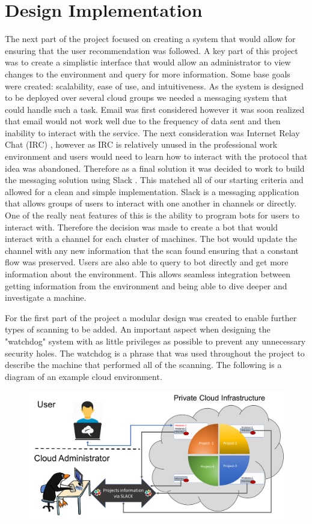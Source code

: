 \documentclass[12pt]{article}
\begin{document}
\section{Design Implementation}
The next part of the project focused on creating a system that would allow for ensuring that the user recommendation was followed. A key part of this project was to create a simplistic interface that would allow an administrator to view changes to the environment and query for more information. Some base goals were created: scalability, ease of use, and intuitiveness. As the system is designed to be deployed over several cloud groups we needed a messaging system that could handle such a task. Email was first considered however it was soon realized that email would not work well due to the frequency of data sent and then inability to interact with the service. The next consideration was Internet Relay Chat (IRC) \cite{IRC}, however as IRC is relatively unused in the professional work environment and users would need to learn how to interact with the protocol that idea was abandoned. Therefore as a final solution it was decided to work to build the messaging solution using Slack \cite{Slack}. This matched all of our starting criteria and allowed for a clean and simple implementation. Slack is a messaging application that allows groups of users to interact with one another in channels or directly. One of the really neat features of this is the ability to program bots for users to interact with. Therefore the decision was made to create a bot that would interact with a channel for each cluster of machines. The bot would update the channel with any new information that the scan found ensuring that a constant flow was preserved. Users are also able to query to bot directly and get more information about the environment. This allows seamless integration between getting information from the environment and being able to dive deeper and investigate a machine.

For the first part of the project a modular design was created to enable further types of scanning to be added. An important aspect when designing the "watchdog" system with as little privileges as possible to prevent any unnecessary security holes. The watchdog is a phrase that was used throughout the project to describe the machine that performed all of the scanning. The following is a diagram of an example cloud environment.

\begin{figure}[H]
    \centering
    \includegraphics[scale=.4]{./pic/Picture1.png}
\end{figure}
\end{document}
